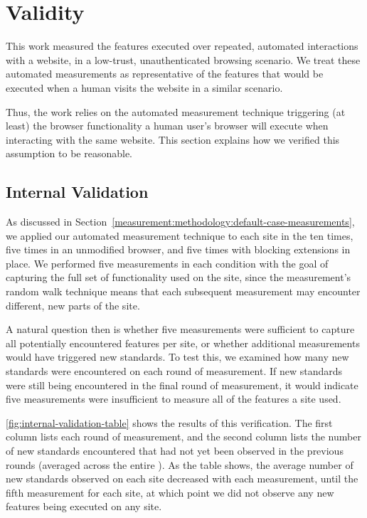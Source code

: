\section{Validity}
\label{measurement:validity}

This work measured the features executed over repeated, automated interactions
with a website, in a low-trust, unauthenticated browsing scenario.  We treat
these automated measurements as representative of the features that would be
executed when a human visits the website in a similar scenario.

Thus, the work relies on the automated measurement technique
triggering (at least) the browser functionality a human user's browser will
execute when interacting with the same website. This section explains how we
verified this assumption to be reasonable.


\subsection{Internal Validation}
\label{measurement:validity:internal-validation}

As discussed in
Section~\ref{measurement:methodology:default-case-measurements}, we applied our
automated measurement technique to each site in the \ATK ten times, five
times in an unmodified browser, and five times with blocking extensions in
place.  We performed five measurements in each condition with the goal of
capturing the full set of functionality used on the site, since the
measurement's random walk technique means that each subsequent measurement may
encounter different, new parts of the site.

A natural question then is whether five measurements were sufficient to capture
all potentially encountered features per site, or whether additional
measurements would have triggered new standards.  To test this, we examined how
many new standards were encountered on each round of measurement.  If new
standards were still being encountered in the final round of measurement, it
would indicate five measurements were insufficient to measure all of
the features a site used.

\ref{fig:internal-validation-table} shows the results of this verification.
The first column lists each round of measurement, and the second column lists
the number of new standards encountered that had not yet been observed in the
previous rounds (averaged across the entire \ATK).  As the table shows,
the average number of new standards observed on each site decreased with each
measurement, until the fifth measurement for each site, at which point we did
not observe any new features being executed on any site.

